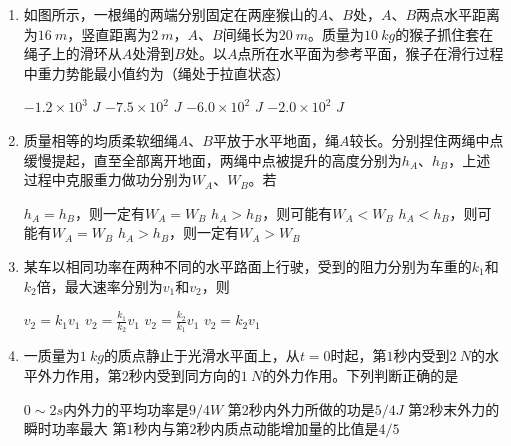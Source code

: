 \begin{enumerate}[leftmargin=0em]
{\begin{enumerate}
\end{enumerate}


}




\item 
{}
如图所示，一根绳的两端分别固定在两座猴山的$ A $、$ B $处，$ A $、$ B $两点水平距离为$ 16 \ m $，竖直距离为$ 2 \ m $，$ A $、$ B $间绳长为$ 20 \ m $。质量为$ 10 \ kg $的猴子抓住套在绳子上的滑环从$ A $处滑到$ B $处。以$ A $点所在水平面为参考平面，猴子在滑行过程中重力势能最小值约为（绳处于拉直状态）  
\begin{figure}[h!]
\centering

\end{figure}

\fourchoices
{$ -1.2 \times 10^3 $ $ J $}
{$ -7.5 \times 10^2 $ $ J $}
{$ -6.0 \times 10^2 $ $ J $}
{$ -2.0 \times 10^2 $ $ J $}

\item 
{}
质量相等的均质柔软细绳$ A $、$ B $平放于水平地面，绳$ A $较长。分别捏住两绳中点缓慢提起，直至全部离开地面，两绳中点被提升的高度分别为$ h_{A} $、$ h_{B} $，上述过程中克服重力做功分别为$ W_A $、$ W_B $。若  


\fourchoices
{$ h_{A} = h_{B} $，则一定有$ W_A=W_B $}
{$ h_{A} > h_{B} $，则可能有$ W_A<W_B $}
{$ h_{A} < h_{B} $，则可能有$ W_A=W_B $}
{$ h_{A} > h_{B} $，则一定有$ W_A>W_B $}


\item 
{}
某车以相同功率在两种不同的水平路面上行驶，受到的阻力分别为车重的$ k_{1} $和$ k_{2} $倍，最大速率分别为$ v_{1} $和$ v_{2} $，则  

\fourchoices
{$ v _ { 2 } = k _ { 1 } v _ { 1 } $}
{$ v _ { 2 } = \frac { k _ { 1 } } { k _ { 2 } } v _ { 1 } $}
{$ v _ { 2 } = \frac { k _ { 2 } } { k _ { 1 } } v _ { 1 } $}
{$ v _ { 2 } = k _ { 2 } v _ { 1 } $}




\item 
{}
一质量为$ 1 \ kg $的质点静止于光滑水平面上，从$ t=0 $时起，第$ 1 $秒内受到$ 2 \ N $的水平外力作用，第$ 2 $秒内受到同方向的$ 1 \ N $的外力作用。下列判断正确的是  

\fourchoices
{$ 0 \sim 2s $内外力的平均功率是$ 9/4W $}
{第$ 2 $秒内外力所做的功是$ 5/4J $}
{第$ 2 $秒末外力的瞬时功率最大}
{第$ 1 $秒内与第$ 2 $秒内质点动能增加量的比值是$ 4/5 $}





\end{enumerate}
